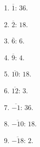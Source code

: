 \documentclass{article}
\begin{document}
\begin{enumerate}[label=$\ast$]
      \item $\overline{1}$: $36$.
      \item $\overline{2}$: $18$.
      \item $\overline{6}$: $6$.
      \item $\overline{9}$: $4$.
      \item $\overline{10}$: $18$.
      \item $\overline{12}$: $3$.
      \item $\overline{-1}$: $36$.
      \item $\overline{-10}$: $18$.
      \item $\overline{-18}$: $2$.
\end{enumerate}
\end{document}
